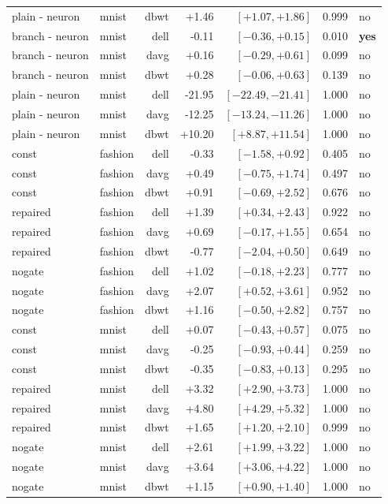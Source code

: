 \documentclass[10pt]{article}
\begin{document}
\begin{table}[h]
\begin{tabular}{llrrrrl}
plain - neuron & mnist & dbwt & +1.46 & $[+1.07, +1.86]$ & 0.999 & no \\
branch - neuron & mnist & dell & -0.11 & $[-0.36, +0.15]$ & 0.010 & \textbf{yes} \\
branch - neuron & mnist & davg & +0.16 & $[-0.29, +0.61]$ & 0.099 & no \\
branch - neuron & mnist & dbwt & +0.28 & $[-0.06, +0.63]$ & 0.139 & no \\
plain - neuron & mnist & dell & -21.95 & $[-22.49, -21.41]$ & 1.000 & no \\
plain - neuron & mnist & davg & -12.25 & $[-13.24, -11.26]$ & 1.000 & no \\
plain - neuron & mnist & dbwt & +10.20 & $[+8.87, +11.54]$ & 1.000 & no \\
const & fashion & dell & -0.33 & $[-1.58, +0.92]$ & 0.405 & no \\
const & fashion & davg & +0.49 & $[-0.75, +1.74]$ & 0.497 & no \\
const & fashion & dbwt & +0.91 & $[-0.69, +2.52]$ & 0.676 & no \\
repaired & fashion & dell & +1.39 & $[+0.34, +2.43]$ & 0.922 & no \\
repaired & fashion & davg & +0.69 & $[-0.17, +1.55]$ & 0.654 & no \\
repaired & fashion & dbwt & -0.77 & $[-2.04, +0.50]$ & 0.649 & no \\
nogate & fashion & dell & +1.02 & $[-0.18, +2.23]$ & 0.777 & no \\
nogate & fashion & davg & +2.07 & $[+0.52, +3.61]$ & 0.952 & no \\
nogate & fashion & dbwt & +1.16 & $[-0.50, +2.82]$ & 0.757 & no \\
const & mnist & dell & +0.07 & $[-0.43, +0.57]$ & 0.075 & no \\
const & mnist & davg & -0.25 & $[-0.93, +0.44]$ & 0.259 & no \\
const & mnist & dbwt & -0.35 & $[-0.83, +0.13]$ & 0.295 & no \\
repaired & mnist & dell & +3.32 & $[+2.90, +3.73]$ & 1.000 & no \\
repaired & mnist & davg & +4.80 & $[+4.29, +5.32]$ & 1.000 & no \\
repaired & mnist & dbwt & +1.65 & $[+1.20, +2.10]$ & 0.999 & no \\
nogate & mnist & dell & +2.61 & $[+1.99, +3.22]$ & 1.000 & no \\
nogate & mnist & davg & +3.64 & $[+3.06, +4.22]$ & 1.000 & no \\
nogate & mnist & dbwt & +1.15 & $[+0.90, +1.40]$ & 1.000 & no \\
\bottomrule
\end{tabular}
\end{table}
\end{document}
